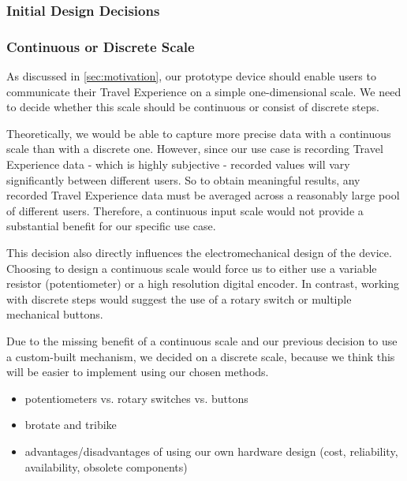 \subsubsection{Initial Design Decisions}

\subsubsection*{Continuous or Discrete Scale}

As discussed in \autoref{sec:motivation}, our prototype device should enable users to communicate their Travel Experience on a simple one-dimensional scale.
We need to decide whether this scale should be continuous or consist of discrete steps.

Theoretically, we would be able to capture more precise data with a continuous scale than with a discrete one.
However, since our use case is recording Travel Experience data - which is highly subjective - recorded values will vary significantly between different users.
So to obtain meaningful results, any recorded Travel Experience data must be averaged across a reasonably large pool of different users.
Therefore, a continuous input scale would not provide a substantial benefit for our specific use case.

This decision also directly influences the electromechanical design of the device.
Choosing to design a continuous scale would force us to either use a variable resistor (potentiometer) or a high resolution digital encoder.
In contrast, working with discrete steps would suggest the use of a rotary switch or multiple mechanical buttons.

Due to the missing benefit of a continuous scale and our previous decision to use a custom-built mechanism, we decided on a discrete scale, because we think this will be easier to implement using our chosen methods.

\cite{gesturing_on_the_handlebars} \cite{no_need_to_stop} \cite{text_me_if_you_can} \cite{brotate_and_tribike}

\begin{itemize}
    \item potentiometers vs. rotary switches vs. buttons
    \item brotate and tribike \cite{brotate_and_tribike}
    \item advantages/disadvantages of using our own hardware design (cost, reliability, availability, obsolete components)
\end{itemize}

